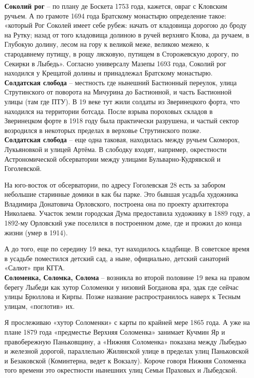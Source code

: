 \textbf{Соколий рог} – по плану де Боскета 1753 года, кажется, овраг с Кловским ручьем. А по грамоте 1694 года Братскому монастырю определение такое: «который Рог Соколей имеет себе рубеж: начать от кладовища дорогою до броду на Рутку; назад от того кладовища долиною в ручей верхняго Клова, да ручаем, в Глубокую долину, лесом на гору к великой меже, великою межею, к стародавнему путищу, в рощу лясковую, путищем в Сторожевскую дорогу, по Секирки в Лыбедь». Согласно универсалу Мазепы 1693 года, Соколий рог находился у Крещатой долины и принадлежал Братскому монастырю.\\

\textbf{Солдатская слобода} – местность где нынешний Бастионный переулок, улица Струтинского от поворота на Мичурина до Бастионной, и часть Бастионной улицы (там где ПТУ). В 19 веке тут жили солдаты из Зверинецкого форта, что находился на территории ботсада. После взрыва пороховых складов в Зверинецком форте в 1918 году была практически разрушена, и частый сектор возродился в некоторых пределах в верховье Струтинского позже.\\

\textbf{Солдатская слобода} – еще одна таковая, находилась между ручьем Скоморох, Лукьяновкой и улицей Артёма. В слободку входят, например, окрестности Астрономической обсерватории между улицами Бульварно-Кудрявской и Гоголевской.

На юго-восток от обсерватории, по адресу Гоголевская 28 есть за забором небольшие старинные домики в как бы парке. Это бывшая усадьба художника Владимира Донатовича Орловского, построена она по проекту архитектора Николаева. Участок земли городская Дума предоставила художнику в 1889 году, а 1892-му Орловский уже поселился в построенном доме, где и прожил до конца жизни (умер в 1914).

А до того, еще по середину 19 века, тут находилось кладбище. В советское время в усадьбе поместился детский сад, а ныне, официально, детский санаторий «Салют» при КГГА.\\

\textbf{Соломенка, Соломка, Солома} – возникла во второй половине 19 века на правом берегу Лыбеди как хутор Соломенки у низовий Богданова яра, эдак где сейчас улицы Брюллова и Кирпы. Позже название распространилось наверх к Тесным улицам, «поглотив» их. 

Я прослеживаю «хутор Соломенки» с карты по крайней мере 1865 года. А уже на плане 1879 года «предместье Верхняя Соломенка» занимает Кучмин Яр и правобережную Паньковщину, а «Нижняя Соломенка» показана между Лыбедью и железной дорогой, параллельно Жилянской улице в пределах улиц Паньковской и Безаковской (Коминтерна, ведет к Вокзалу). Короче говоря Нижняя Соломенка того времени это окрестности нынешних улиц Семьи Праховых и Лыбедской.

